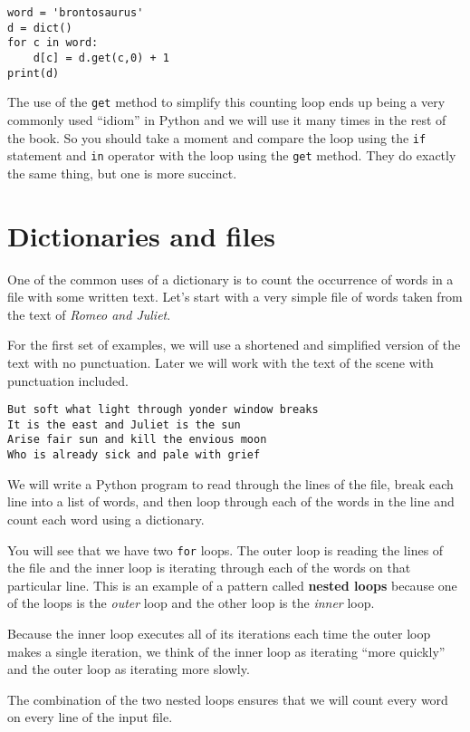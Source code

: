 \beforeverb
\begin{verbatim}
word = 'brontosaurus'
d = dict()
for c in word:
    d[c] = d.get(c,0) + 1
print(d)
\end{verbatim}
\afterverb
%
The use of the {\tt get} method to simplify this counting loop 
ends up being a very commonly used ``idiom'' in Python and 
we will use it many times in the rest of the book.   So you should
take a moment and compare the loop using the {\tt if} statement
and {\tt in} operator with the loop using the {\tt get} method.
They do exactly the same thing, but one is more succinct.

\section{Dictionaries and files}

One of the common uses of a dictionary is to count the occurrence
of words in a file with some written text.  
Let's start with a very simple file of
words taken from the text of \emph{Romeo and Juliet}.

For the first set of examples, we will use a shortened and simplified version
of the text with no punctuation.  Later we will work with the text of the 
scene with punctuation included.

\beforeverb
\begin{verbatim}
But soft what light through yonder window breaks
It is the east and Juliet is the sun
Arise fair sun and kill the envious moon
Who is already sick and pale with grief
\end{verbatim}
\afterverb
%
We will write a Python program to read through the lines of the file, 
break each line into a list of words, and then loop through each 
of the words in the line and count each word using a dictionary.

You will see that we have two {\tt for} loops.  The outer loop is reading the
lines of the file and the inner loop is iterating through each
of the words on that particular line.  This is an example
of a pattern called {\bf nested loops} because one of the loops
is the \emph{outer} loop and the other loop is the \emph{inner}
loop.  

Because the inner loop executes all of its iterations each time
the outer loop makes a single iteration, we think of the inner
loop as iterating ``more quickly'' and the outer loop as iterating 
more slowly.

The combination of the two nested loops ensures that we will count
every word on every line of the input file.

